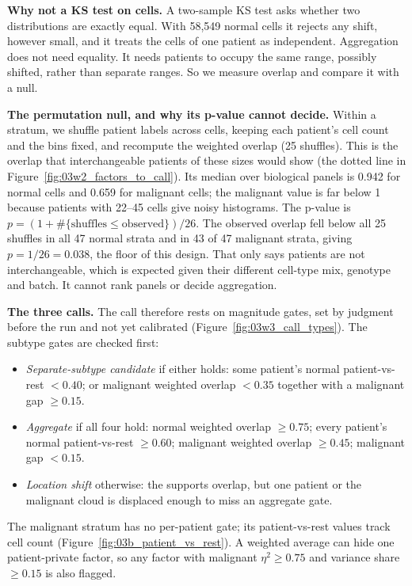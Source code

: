 \textbf{Why not a KS test on cells.} A two-sample KS test asks whether two distributions are exactly equal. With 58,549 normal cells it rejects any shift, however small, and it treats the cells of one patient as independent. Aggregation does not need equality. It needs patients to occupy the same range, possibly shifted, rather than separate ranges. So we measure overlap and compare it with a null.

\textbf{The permutation null, and why its p-value cannot decide.} Within a stratum, we shuffle patient labels across cells, keeping each patient's cell count and the bins fixed, and recompute the weighted overlap (25 shuffles). This is the overlap that interchangeable patients of these sizes would show (the dotted line in Figure~\ref{fig:03w2_factors_to_call}). Its median over biological panels is 0.942 for normal cells and 0.659 for malignant cells; the malignant value is far below 1 because patients with 22--45 cells give noisy histograms. The p-value is $p=(1+\#\{\text{shuffles}\leq\text{observed}\})/26$. The observed overlap fell below all 25 shuffles in all 47 normal strata and in 43 of 47 malignant strata, giving $p=1/26=0.038$, the floor of this design. That only says patients are not interchangeable, which is expected given their different cell-type mix, genotype and batch. It cannot rank panels or decide aggregation.

\textbf{The three calls.} The call therefore rests on magnitude gates, set by judgment before the run and not yet calibrated (Figure~\ref{fig:03w3_call_types}). The subtype gates are checked first:
\begin{itemize}
\item \emph{Separate-subtype candidate} if either holds: some patient's normal patient-vs-rest $< 0.40$; or malignant weighted overlap $< 0.35$ together with a malignant gap $\geq 0.15$.
\item \emph{Aggregate} if all four hold: normal weighted overlap $\geq 0.75$; every patient's normal patient-vs-rest $\geq 0.60$; malignant weighted overlap $\geq 0.45$; malignant gap $< 0.15$.
\item \emph{Location shift} otherwise: the supports overlap, but one patient or the malignant cloud is displaced enough to miss an aggregate gate.
\end{itemize}
The malignant stratum has no per-patient gate; its patient-vs-rest values track cell count (Figure~\ref{fig:03b_patient_vs_rest}). A weighted average can hide one patient-private factor, so any factor with malignant $\eta^2 \geq 0.75$ and variance share $\geq 0.15$ is also flagged.

